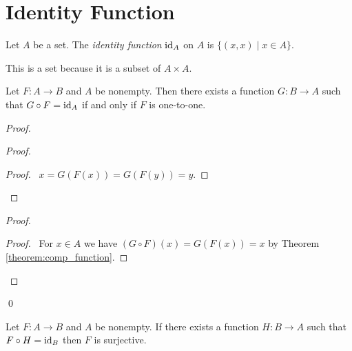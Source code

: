 \section{Identity Function}

\begin{definition}
    Let $A$ be a set. The \emph{identity function} $\mathrm{id}_{A}$ on $A$ is
    $\{ (x,x) \mid x \in A \}$.

    This is a set because it is a subset of $A \times A$.
\end{definition}

\begin{theorem}
    Let $F : A \rightarrow B$ and $A$ be nonempty. Then there exists a function
    $G : B \rightarrow A$ such that $G \circ F = \mathrm{id}_{A}$ if and only if $F$
    is one-to-one.
\end{theorem}

\begin{proof}
    \pf
    \begin{proof}
        \begin{proof}
            \pf\ $x = G(F(x)) = G(F(y)) = y$.
        \end{proof}
    \end{proof}
    \begin{proof}
        \begin{proof}
            \pf\ For $x \in A$ we have $(G \circ F)(x) = G(F(x)) = x$ by Theorem \ref{theorem:comp_function}.
        \end{proof}
    \end{proof}
    \qed
\end{proof}

\begin{theorem}
    Let $F : A \rightarrow B$ and $A$ be nonempty. If there exists a function
    $H : B \rightarrow A$ such that $F \circ H = \mathrm{id}_{B}$ then $F$
    is surjective.
\end{theorem}

